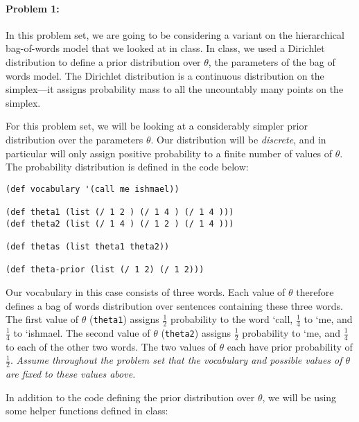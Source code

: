 \documentclass[12pt, letterpaper]{article}
\begin{document}
\pagestyle{fancy}
\paragraph{Problem 1:}
In this problem set, we are going to be considering a variant on the
hierarchical bag-of-words model that we looked at in class. In class,
we used a Dirichlet distribution to define a prior distribution over
$\theta$, the parameters of the bag of words model. The Dirichlet
distribution is a continuous distribution on the simplex---it assigns
probability mass to all the uncountably many points on the simplex.

For this problem set, we will be looking at a considerably simpler
prior distribution over the parameters $\theta$. Our distribution will
be \emph{discrete}, and in particular will only assign positive
probability to a finite number of values of $\theta$. The probability
distribution is defined in the code below:

\begin{lstlisting}
(def vocabulary '(call me ishmael))

(def theta1 (list (/ 1 2 ) (/ 1 4 ) (/ 1 4 )))
(def theta2 (list (/ 1 4 ) (/ 1 2 ) (/ 1 4 )))

(def thetas (list theta1 theta2))

(def theta-prior (list (/ 1 2) (/ 1 2)))
\end{lstlisting}

Our vocabulary in this case consists of three words. Each value of
$\theta$ therefore defines a bag of words distribution over sentences
containing these three words. The first value of $\theta$
(\texttt{theta1}) assigns $\frac{1}{2}$ probability to the word `call,
$\frac{1}{4}$ to `me, and $\frac{1}{4}$ to `ishmael. The second value
of $\theta$ (\texttt{theta2}) assigns $\frac{1}{2}$ probability to
`me, and $\frac{1}{4}$ to each of the other two words. The two values
of $\theta$ each have prior probability of $\frac{1}{2}$. \emph{Assume
  throughout the problem set that the vocabulary and possible values
  of $\theta$ are fixed to these values above.}

In addition to the code defining the prior distribution over $\theta$,
we will be using some helper functions defined in class:
\end{document}
